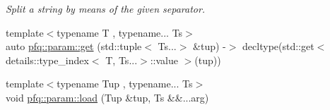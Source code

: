 \begin{DoxyCompactItemize}
\begin{DoxyCompactList}\small\item\em Split a string by means of the given separator. \end{DoxyCompactList}\item 
{\footnotesize template$<$typename T , typename... Ts$>$ }\\auto \hyperlink{namespacepfq_1_1param_a09da2abc1a228d7f77c35bed3bdb157d}{pfq\+::param\+::get} (std\+::tuple$<$ Ts...$>$ \&tup) -\/$>$ decltype(std\+::get$<$ details\+::type\+\_\+index$<$ T, Ts...$>$\+::value $>$(tup))
\item 
{\footnotesize template$<$typename Tup , typename... Ts$>$ }\\void \hyperlink{namespacepfq_1_1param_aeabbdcec021e01a0a9321678fea99d8f}{pfq\+::param\+::load} (Tup \&tup, Ts \&\&...arg)
\end{DoxyCompactItemize}
